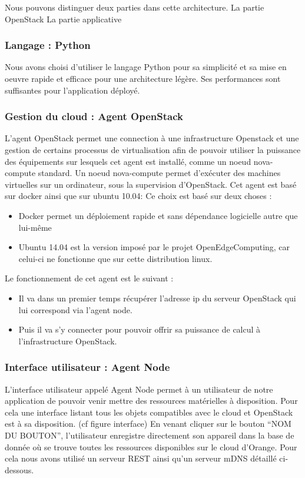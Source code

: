 \documentclass[twocolumn,a4paper]{IEEEtranfr}
\begin{document}
Nous pouvons distinguer deux parties dans cette architecture.
La partie OpenStack
La partie applicative

\subsubsection{Langage : Python}

Nous avons choisi d’utiliser le langage Python pour sa simplicité et sa mise en oeuvre rapide et efficace pour une architecture légère. Ses performances sont suffisantes pour l’application déployé.

\subsubsection{Gestion du cloud : Agent OpenStack}

L’agent OpenStack permet une connection à une infrastructure Openstack et une gestion de certains processus de virtualisation afin de pouvoir utiliser la puissance des équipements sur lesquels cet agent est installé, comme un noeud nova-compute standard. Un noeud nova-compute permet d'exécuter des machines virtuelles sur un ordinateur, sous la supervision d’OpenStack. Cet agent est basé sur docker ainsi que sur ubuntu 10.04:
Ce choix est basé sur deux choses :
\begin{itemize}
	\item Docker permet un déploiement rapide et sans dépendance logicielle autre que lui-même
	\item Ubuntu 14.04 est la version imposé par le projet OpenEdgeComputing, car celui-ci ne fonctionne que sur cette distribution linux.
\end{itemize}

Le fonctionnement de cet agent est le suivant : 
\begin{itemize}
	\item Il va dans un premier temps récupérer l’adresse ip du serveur OpenStack qui lui correspond via l’agent node.
	\item Puis il va s’y connecter pour pouvoir offrir sa puissance de calcul à l’infrastructure OpenStack.
\end{itemize}
\subsubsection{Interface utilisateur : Agent Node}

L’interface utilisateur appelé Agent Node permet à un utilisateur de notre application de pouvoir venir mettre des ressources matérielles à disposition. Pour cela une interface listant tous les objets compatibles avec le cloud et OpenStack est à sa disposition. (cf figure interface) En venant cliquer sur le bouton “NOM DU BOUTON”, l’utilisateur enregistre directement son appareil dans la base de donnée où se trouve toutes les ressources disponibles sur le cloud d’Orange. Pour cela nous avons utilisé un serveur REST ainsi qu’un serveur mDNS détaillé ci-dessous.
\end{document}
